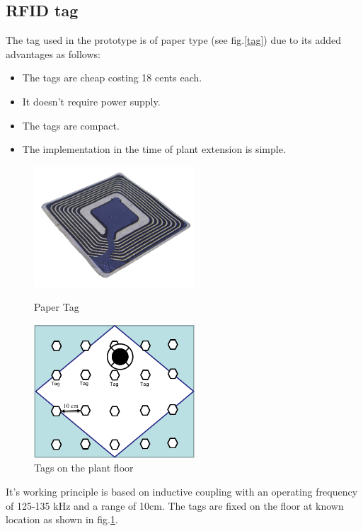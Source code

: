 \subsection{RFID tag}
The tag used in the prototype is of paper type (see fig.\ref{tag}) due to its added advantages as follows:
\begin{itemize}
	\item The tags are cheap costing 18 cents each.
	\item It doesn't require power supply.
	\item The tags are compact.
	\item The implementation in the time of plant extension is simple.
\end{itemize}
\begin{figure}[!htbp]
	\centering
	\begin{minipage}{.5\textwidth}
		\centering
		\includegraphics[width = 6cm]{Pictures/tag}%
		\caption[The ListOfFigures caption]{Paper Tag \footnotemark[1]}
		\label{tag}
	\end{minipage}%
	\begin{minipage}{.5\textwidth}
		\centering
		\includegraphics[width = 6cm]{Pictures/tagsfloor}%
		\caption{Tags on the plant floor}
		\label{tags_floor}
	\end{minipage}
\end{figure}
It's working principle is based on inductive coupling with an operating frequency of 125-135 kHz and a range of 10cm. The tags are fixed on the floor at known location as shown in fig.\ref{tags_floor}.
